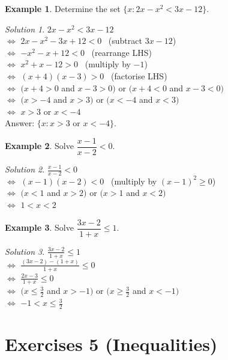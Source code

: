\documentclass[
  12pt,
  oneside]{book}
\theoremstyle{definition}
\theoremstyle{definition}
\newtheorem{example}{Example}[chapter]
\theoremstyle{definition}
\theoremstyle{definition}
\theoremstyle{remark}
\newtheorem*{solution}{Solution}
\begin{document}
\begin{example}
Determine the set \(\{x: 2x-x^2<3x-12\}\).
\end{example}

\begin{solution}
\(2x-x^2<3x-12\)\\
\(\iff\) \(2x-x^2-3x+12<0\) \hfill~{(subtract \(3x-12\))}\\
\(\iff\) \(-x^2-x+12<0\) \hfill~{(rearrange LHS)}\\
\(\iff\) \(x^2+x-12>0\) \hfill~{(multiply by \(-1\))}\\
\(\iff\) \((x+4)(x-3)>0\) \hfill~{(factorise LHS)}\\
\(\iff\) \(\big( x+4>0\) and \(x-3>0\big)\) or \(\big(x+4<0\) and \(x-3<0\big)\)\\
\(\iff\) \(\big( x>-4\) and \(x>3\big)\) or \(\big(x<-4\) and \(x<3\big)\)\\
\(\iff\) \(x>3\) or \(x<-4\)\\
Answer: \(\{x: x>3\text{ or }x<-4\}\).
\end{solution}

\begin{example}
Solve \(\dfrac{x-1}{x-2}<0\).
\end{example}

\begin{solution}
\(\frac{x-1}{x-2}<0\)\\
\(\iff\) \((x-1)(x-2)<0\) \hfill~{(multiply by \((x-1)^2\geq 0\))}\\
\(\iff\) \(\big( x<1\) and \(x>2\big)\) or \(\big(x>1\) and \(x<2\big)\)\\
\(\iff\) \(1<x<2\)
\end{solution}

\begin{example}
Solve \(\dfrac{3x-2}{1+x}\leq 1\).
\end{example}

\begin{solution}
\(\frac{3x-2}{1+x}\leq1\)\\
\(\iff\) \(\frac{(3x-2)-(1+x)}{1+x}\leq0\)\\
\(\iff\) \(\frac{2x-3}{1+x}\leq0\)\\
\(\iff\) \(\big( x\leq\frac{3}{2}\) and \(x>-1\big)\) or \(\big(x\geq \frac{3}{2}\) and \(x<-1\big)\)\\
\(\iff\) \(-1<x\leq\frac{3}{2}\)
\end{solution}

\chapter*{Exercises 5 (Inequalities)}\label{exercises-5-inequalities}
\end{document}
